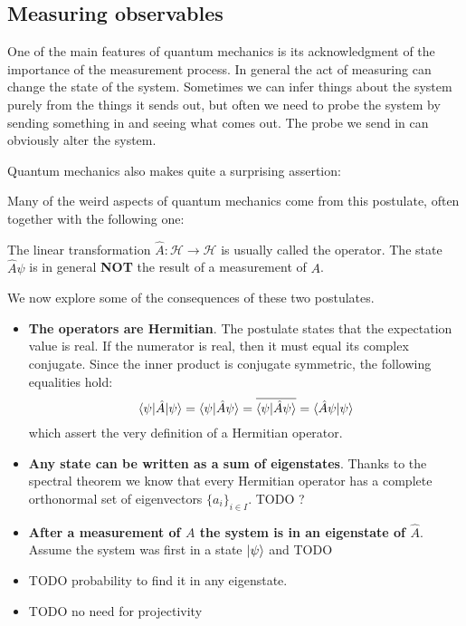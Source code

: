 \subsection{Measuring observables}
One of the main features of quantum mechanics is its acknowledgment of the importance of the measurement process. In general the act of measuring can change the state of the system. Sometimes we can infer things about the system purely from the things it sends out, but often we need to probe the system by sending something in and seeing what comes out. The probe we send in can obviously alter the system.

Quantum mechanics also makes quite a surprising assertion:

Many of the weird aspects of quantum mechanics come from this postulate, often together with the following one:


The linear transformation $\hat{A}: \mathcal{H} \to \mathcal{H}$ is usually called the operator. The state $\hat{A}\psi$ is in general \textbf{NOT} the result of a measurement of $A$.

We now explore some of the consequences of these two postulates.

\begin{itemize}
\item \textbf{The operators are Hermitian}.
The postulate states that the expectation value is real. If the numerator is real, then it must equal its complex conjugate. Since the inner product is conjugate symmetric, the following equalities hold:
\[ \braket[\hat{A}]{\psi}{\psi} = \braket{\psi}{\hat{A}\psi} = \overline{\braket{\psi}{\hat{A}\psi}} = \braket{\hat{A}\psi}{\psi} \]
which assert the very definition of a Hermitian operator.
\item \textbf{Any state can be written as a sum of eigenstates}.
Thanks to the spectral theorem we know that every Hermitian operator has a complete orthonormal set of eigenvectors $\{a_i\}_{i\in I}$. TODO ?
\item \textbf{After a measurement of $A$ the system is in an eigenstate of $\hat{A}$}.
Assume the system was first in a state $\left| \psi \right\rangle$ and TODO
\item TODO probability to find it in any eigenstate.
\item TODO no need for projectivity
\end{itemize}

